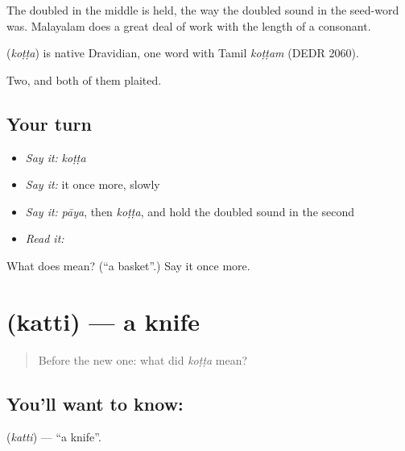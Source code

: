 The doubled  in the middle is held, the way the doubled sound in the seed-word was. Malayalam does a great deal of work with the length of a consonant.

\begin{cousinweb}
\textbf{} (\emph{koṭṭa}) is native Dravidian, one word with Tamil \emph{koṭṭam} (DEDR 2060).
\end{cousinweb}

\begin{grammarlens}[title={What you've built}]
Two, and both of them plaited.
\end{grammarlens}

\subsection*{Your turn}
\begin{itemize}
\raggedright
  \item \emph{Say it:} \emph{koṭṭa}
  \item \emph{Say it:} it once more, slowly
  \item \emph{Say it:} \emph{pāya}, then \emph{koṭṭa}, and hold the doubled sound in the second
  \item \emph{Read it:} \textbf{}
\end{itemize}

\begin{tcolorbox}[breakable,colback=teal!4,colframe=teal!35!black,title={Before you move on}]
What does  mean? (\textquotedblleft{}a basket\textquotedblright{}.) Say it once more.
\end{tcolorbox}
\section[\texorpdfstring{\ml{കത്തി} (katti)}{കത്തി (katti)}]{ (katti) — a knife}

\label{lesson:ML-C56-knife}



\begin{quote}
Before the new one: what did \emph{koṭṭa} mean?
\end{quote}

\subsection*{You'll want to know: }
\textbf{} (\emph{katti}) — \textquotedblleft{}a knife\textquotedblright{}.


